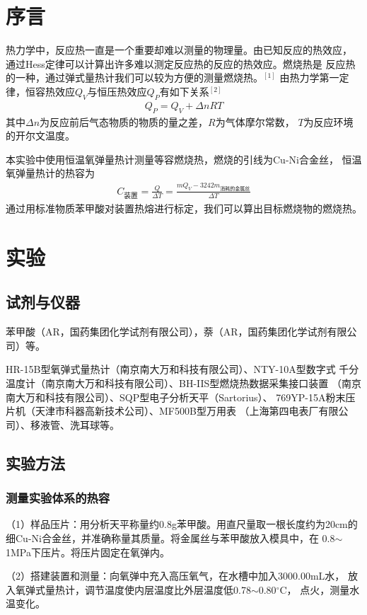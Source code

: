 \documentclass[12pt]{ctexart}
\numberwithin{equation}{section}
\begin{document}
\section{序言}

热力学中，反应热一直是一个重要却难以测量的物理量。由已知反应的热效应，
通过Hess定律可以计算出许多难以测定反应热的反应的热效应。燃烧热是
反应热的一种，通过弹式量热计我们可以较为方便的测量燃烧热。$^{[1]}$
由热力学第一定律，恒容热效应$Q_V$与恒压热效应$Q_P$有如下关系$^{[2]}$
\begin{align}
    Q_P = Q_V + \Delta nRT
\end{align}
其中$\Delta n$为反应前后气态物质的物质的量之差，$R$为气体摩尔常数，
$T$为反应环境的开尔文温度。

本实验中使用恒温氧弹量热计测量等容燃烧热，燃烧的引线为Cu-Ni合金丝，
恒温氧弹量热计的热容为
\begin{align}
    C_{\text{装置}} = \frac{Q}{\Delta T}
    = \frac{mQ_V - 3242 m_{\text{消耗的金属丝}}}{\Delta T}
\end{align}
通过用标准物质苯甲酸对装置热熔进行标定，我们可以算出目标燃烧物的燃烧热。

\section{实验}
\subsection{试剂与仪器}
苯甲酸（AR，国药集团化学试剂有限公司），萘（AR，国药集团化学试剂有限公司）等。

HR-15B型氧弹式量热计（南京南大万和科技有限公司）、NTY-10A型数字式
千分温度计（南京南大万和科技有限公司）、BH-IIS型燃烧热数据采集接口装置
（南京南大万和科技有限公司）、SQP型电子分析天平（Sartorius）、
769YP-15A粉末压片机（天津市科器高新技术公司）、MF500B型万用表
（上海第四电表厂有限公司）、移液管、洗耳球等。

\subsection{实验方法}
\subsubsection{测量实验体系的热容}
（1）样品压片：用分析天平称量约0.8g苯甲酸。用直尺量取一根长度约为20cm的
细Cu-Ni合金丝，并准确称量其质量。将金属丝与苯甲酸放入模具中，在
0.8$\sim$1MPa下压片。将压片固定在氧弹内。

（2）搭建装置和测量：向氧弹中充入高压氧气，在水槽中加入3000.00mL水，
放入氧弹式量热计，调节温度使内层温度比外层温度低0.78$\sim$0.80$^\circ$C，
点火，测量水温变化。
\end{document}
